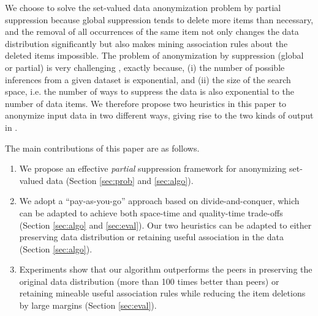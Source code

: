 We choose to solve the set-valued data anonymization problem by partial
suppression because global suppression tends to
delete more items than necessary,
and the removal of all occurrences of the same item not only changes the
data distribution significantly but also makes mining association rules
about the deleted items impossible.
%
The problem of anonymization by suppression (global or partial) is very
challenging \cite{atallah99:disclosure,Xu:2008:ATD}, exactly because, (i) the number of possible inferences from
a given dataset is exponential, and (ii) the size of the search space, i.e.
the number of ways to suppress the data is also exponential to the number of
data items. We therefore propose two heuristics in this paper to anonymize
input data in two different ways, giving rise to the two kinds of output
in .

The main contributions of this paper are as follows.
\begin{enumerate}
\item We propose an effective \emph{partial} suppression framework for anonymizing
    set-valued data (Section \ref{sec:prob} and
    \ref{sec:algo}).
\item We adopt a ``pay-as-you-go'' approach based on divide-and-conquer,
    which can be adapted to achieve both space-time and quality-time
    trade-offs (Section \ref{sec:algo} and \ref{sec:eval}). Our two heuristics
    can be adapted to either preserving data distribution or retaining useful
    association in the data (Section \ref{sec:algo}).
\item Experiments show that our algorithm outperforms
    the peers in preserving the
    original data distribution (more than 100 times better
    than peers)
    or retaining mineable useful association
    rules while reducing the item deletions
    by large margins (Section \ref{sec:eval}).
\end{enumerate}
